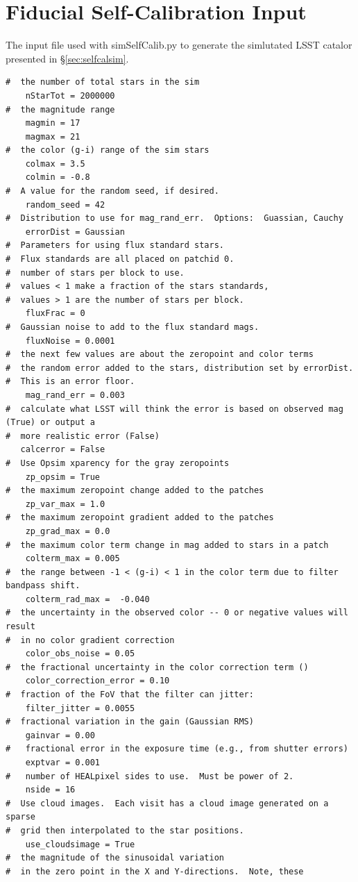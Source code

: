 \documentclass[12pt,preprint]{aastex}
\begin{document}
\section{Fiducial Self-Calibration Input}\label{sec:siminput}
The input file used with simSelfCalib.py to generate the simlutated LSST catalor presented in \S\ref{sec:selfcalsim}.
\begin{verbatim}
#  the number of total stars in the sim
    nStarTot = 2000000
#  the magnitude range  
    magmin = 17
    magmax = 21
#  the color (g-i) range of the sim stars
    colmax = 3.5
    colmin = -0.8
#  A value for the random seed, if desired.
    random_seed = 42
#  Distribution to use for mag_rand_err.  Options:  Guassian, Cauchy
    errorDist = Gaussian
#  Parameters for using flux standard stars.  
#  Flux standards are all placed on patchid 0.
#  number of stars per block to use.  
#  values < 1 make a fraction of the stars standards, 
#  values > 1 are the number of stars per block.
    fluxFrac = 0
#  Gaussian noise to add to the flux standard mags.
    fluxNoise = 0.0001 
#  the next few values are about the zeropoint and color terms
#  the random error added to the stars, distribution set by errorDist.  
#  This is an error floor.
    mag_rand_err = 0.003
#  calculate what LSST will think the error is based on observed mag (True) or output a 
#  more realistic error (False)
   calcerror = False
#  Use Opsim xparency for the gray zeropoints
    zp_opsim = True
#  the maximum zeropoint change added to the patches
    zp_var_max = 1.0
#  the maximum zeropoint gradient added to the patches
    zp_grad_max = 0.0
#  the maximum color term change in mag added to stars in a patch
    colterm_max = 0.005
#  the range between -1 < (g-i) < 1 in the color term due to filter bandpass shift. 
    colterm_rad_max =  -0.040
#  the uncertainty in the observed color -- 0 or negative values will result
#  in no color gradient correction
    color_obs_noise = 0.05
#  the fractional uncertainty in the color correction term ()
    color_correction_error = 0.10
#  fraction of the FoV that the filter can jitter:   
    filter_jitter = 0.0055
#  fractional variation in the gain (Gaussian RMS)
    gainvar = 0.00
#   fractional error in the exposure time (e.g., from shutter errors)
    exptvar = 0.001
#   number of HEALpixel sides to use.  Must be power of 2.
    nside = 16
#  Use cloud images.  Each visit has a cloud image generated on a sparse 
#  grid then interpolated to the star positions.    
    use_cloudsimage = True
#  the magnitude of the sinusoidal variation 
#  in the zero point in the X and Y-directions.  Note, these 

\end{verbatim}
\end{document}
